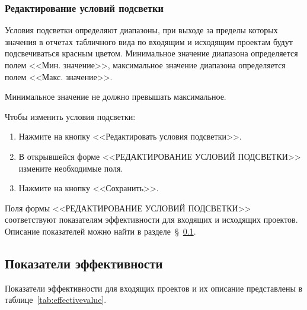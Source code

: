 \subsubsection{Редактирование условий подсветки}

Условия подсветки определяют диапазоны, при выходе за пределы которых значения
в отчетах табличного вида по входящим и исходящим проектам будут
подсвечиваться красным цветом.
Минимальное значение диапазона определяется полем <<Мин. значение>>,
максимальное значение диапазона определяется полем <<Макс. значение>>.

Минимальное значение не должно превышать максимальное.

Чтобы изменить условия подсветки:
\begin{enumerate}
    \item Нажмите на кнопку <<Редактировать условия подсветки>>.
    \item В открывшейся форме <<РЕДАКТИРОВАНИЕ УСЛОВИЙ ПОДСВЕТКИ>> измените необходимые поля.
    \item Нажмите на кнопку <<Сохранить>>.
\end{enumerate}

Поля формы <<РЕДАКТИРОВАНИЕ УСЛОВИЙ ПОДСВЕТКИ>> соответствуют показателям эффективности
для входящих и исходящих проектов. Описание показателей можно найти в разделе~\S~\ref{subsec:показатели-эффективности}.

\subsection{Показатели эффективности}\label{subsec:показатели-эффективности}

Показатели эффективности для входящих проектов и их описание представлены в таблице~\ref{tab:effectivevalue}.

